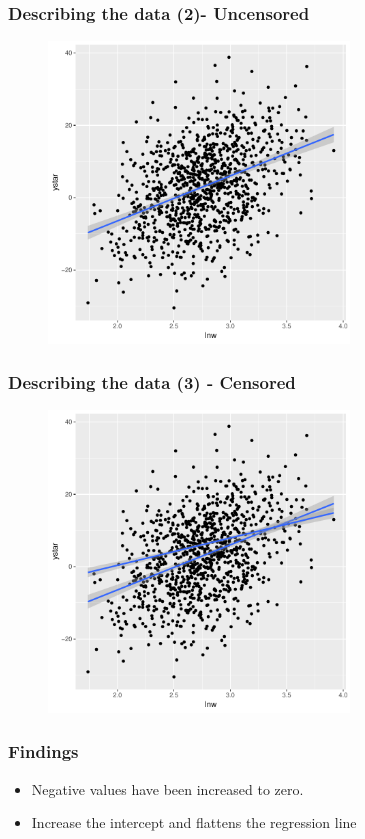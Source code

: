 \documentclass{beamer}
\newcommand{\1}{\mathbb{1}}
\begin{document}
\begin{frame}\frametitle{Describing the data (2)- Uncensored}
\begin{figure}
\includegraphics[width = 8cm]{plot/scatter2}
\end{figure}
\end{frame}

\begin{frame}\frametitle{Describing the data (3) - Censored}
\begin{figure}
\includegraphics[width = 8cm]{plot/scatter3}
\end{figure}
\end{frame}

\begin{frame}\frametitle{Findings}
\begin{itemize}
 \item Negative values have been increased to zero.
 \item Increase the intercept and flattens the regression line
\end{itemize}
\end{frame}
\end{document}
